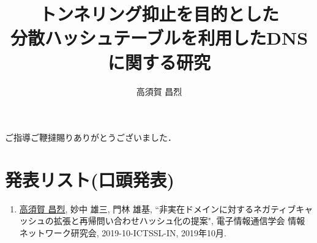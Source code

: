 \documentclass[12pt]{jarticle} %
\title{トンネリング抑止を目的とした\\分散ハッシュテーブルを利用したDNSに関する研究}
\author{高須賀 昌烈}
\begin{document}
\titlepage
\cmemberspage
\firstabstract
\secondabstract



\toc
\newpage
\listoffigures
\newpage
\listoftables
\listofalgorithms



\newpage
{}



%







\newpage
\acknowledgements
ご指導ご鞭撻賜りありがとうございました．




\newpage




\appendix

\section{発表リスト(口頭発表)}
\begin{enumerate}
 \item \underline{高須賀 昌烈}, 妙中 雄三, 門林 雄基, ``非実在ドメインに対するネガティブキャッシュの拡張と再帰問い合わせハッシュ化の提案", 電子情報通信学会 情報ネットワーク研究会, 2019-10-ICTSSL-IN, 2019年10月.
\end{enumerate}
\end{document}
